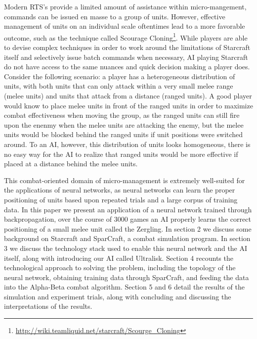 \documentclass[twocolumn]{article}
\begin{document}
Modern RTS's provide a limited amount of assistance within micro-mangement, commands can be issued en masse to a group of units. However, effective management of units on an individual scale oftentimes lead to a more favorable outcome, such as the technique called Scourage Cloning\footnote{\tiny{\url{http://wiki.teamliquid.net/starcraft/Scourge_Cloning}}}. While players are able to devise complex techniques in order to work around the limitations of Starcraft itself and selectively issue batch commands when necessary, AI playing Starcraft do not have access to the same nuances and quick decision making a player does. Consider the following scenario: a player has a heterogeneous distribution of units, with both units that can only attack within a very small melee range (melee units) and units that attack from a distance (ranged units). A good player would know to place melee units in front of the ranged units in order to maximize combat effectiveness when moving the group, as the ranged units can still fire upon the enenmy when the melee units are attacking the enemy, but the melee units would be blocked behind the ranged units if unit positions were switched around. To an AI, however, this distribution of units looks homogeneous, there is no easy way for the AI to realize that ranged units would be more effective if placed at a distance behind the melee units. 

This combat-oriented domain of micro-management is extremely well-suited for the applications of neural networks, as neural networks can learn the proper positioning of units based upon repeated trials and a large corpus of training data. In this paper we present an application of a neural network trained through backpropagation, over the course of 3000 games an AI properly learns the correct positioning of a small melee unit called the Zergling. In section 2 we discuss some background on Starcraft and SparCraft, a combat simulation program. In section 3 we discuss the technology stack used to enable this neural network and the AI itself, along with introducing our AI called Ultralisk. Section 4 recounts the technological approach to solving the problem, including the topology of the neural network, obtaining training data through SparCraft, and feeding the data into the Alpha-Beta combat algorithm. Section 5 and 6 detail the results of the simulation and experiment trials, along with concluding and discussing the interpretations of the results. 
\end{document}
